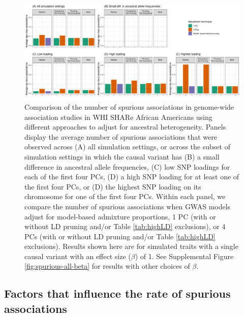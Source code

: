 \documentclass[12pt]{article}
\begin{document}
\begin{figure}[h]
\includegraphics[width=\textwidth]{figs/spurious_counts/gwas/figure7_spurious_beta1}
\caption{Comparison of the number of spurious associations in genome-wide association studies in WHI SHARe African Americans using different approaches to adjust for ancestral heterogeneity. Panels display the average number of spurious associations that were observed across (A) all simulation settings, or across the subset of simulation settings in which the causal variant has (B) a small difference in ancestral allele frequencies, (C) low SNP loadings for each of the first four PCs, (D) a high SNP loading for at least one of the first four PCs, or (D) the highest SNP loading on its chromosome for one of the first four PCs. Within each panel, we compare the number of spurious associations when GWAS models adjust for model-based admixture proportions, 1 PC (with or without LD pruning and/or Table \ref{tab:highLD} exclusions), or 4 PCs (with or without LD pruning and/or Table \ref{tab:highLD} exclusions). Results shown here are for simulated traits with a single causal variant with an effect size ($\beta$) of 1. See Supplemental Figure \ref{fig:spurious-all-beta} for results with other choices of $\beta$.}
\label{fig:spurious}
\end{figure}


\subsection{Factors that influence the rate of spurious associations}
\end{document}
